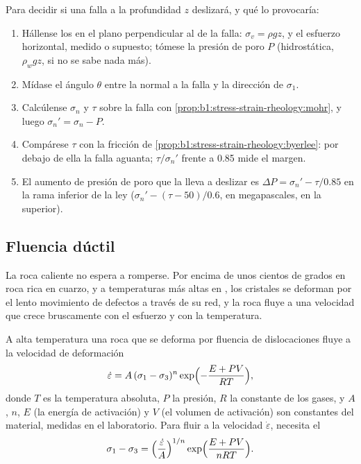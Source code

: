 \begin{method}\label{met:b1:stress-strain-rheology:slip-test}
Para decidir si una falla a la profundidad $z$ deslizará, y qué lo provocaría:
\begin{enumerate}
  \item Hállense los  en el plano perpendicular al  de la falla: $\sigma_v = \rho g z$, y el esfuerzo horizontal, medido o supuesto;
        tómese la presión de poro $P$ (hidrostática, $\rho_w g z$, si no se sabe nada más).
  \item Mídase el ángulo $\theta$ entre la normal a la falla y la dirección de $\sigma_1$.
  \item Calcúlense $\sigma_n$ y $\tau$ sobre la falla con \cref{prop:b1:stress-strain-rheology:mohr}, y luego $\sigma_n' = \sigma_n - P$.
  \item Compárese $\tau$ con la fricción de \cref{prop:b1:stress-strain-rheology:byerlee}: por debajo de ella la falla aguanta; $\tau/\sigma_n'$ frente a 0.85 mide el margen.
  \item El aumento de presión de poro que la lleva a deslizar es
        $\Delta P = \sigma_n' - \tau/0.85$ en la rama inferior de la ley ($\sigma_n' - (\tau - 50)/0.6$, en megapascales, en la superior).
\end{enumerate}
\end{method}

\subsection*{Fluencia dúctil}

La roca caliente no espera a romperse. Por encima de unos cientos de grados en roca rica en cuarzo, y a temperaturas más altas en , los
cristales se deforman por el lento movimiento de defectos a través de su red, y la roca fluye a una velocidad que crece bruscamente con el esfuerzo y con la temperatura.

\begin{proposition}\label{prop:b1:stress-strain-rheology:creep}
A alta temperatura una roca que se deforma por fluencia de dislocaciones fluye a la velocidad de deformación
\[
  \dot\varepsilon = A\,(\sigma_1 - \sigma_3)^n \exp\Bigl(-\frac{E + PV}{RT}\Bigr),
\]
donde $T$ es la temperatura absoluta, $P$ la presión, $R$ la constante de los gases, y $A$, $n$, $E$ (la energía de activación) y $V$ (el volumen de activación)
son constantes del material, medidas en el laboratorio. Para fluir a la velocidad $\dot\varepsilon$, necesita el 
\[
  \sigma_1 - \sigma_3 = \Bigl(\frac{\dot\varepsilon}{A}\Bigr)^{1/n}
  \exp\Bigl(\frac{E + PV}{nRT}\Bigr).
\]
\end{proposition}
\admitted

